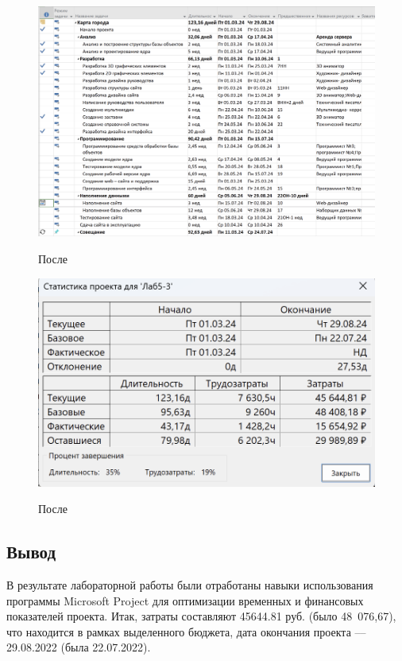 \begin{figure}[ht!]
	\includegraphics[width=0.75\linewidth]{assets/images/Screenshot 2024-03-16 at 13.57.35.png}
	\label{fig:r2}
	\caption{После}
\end{figure}
\FloatBarrier

\begin{figure}[ht!]
	\includegraphics[width=0.75\linewidth]{assets/images/Screenshot 2024-03-16 at 13.59.32.png}
	\label{fig:r2}
	\caption{После}
\end{figure}
\FloatBarrier


\subsection*{Вывод}

В результате лабораторной работы были отработаны навыки использования программы Microsoft Project для оптимизации временных и финансовых показателей проекта. 
Итак, затраты составляют 45644.81 руб. (было 48 076,67), что находится в рамках выделенного бюджета, дата окончания проекта –-- 29.08.2022 (была 22.07.2022).

